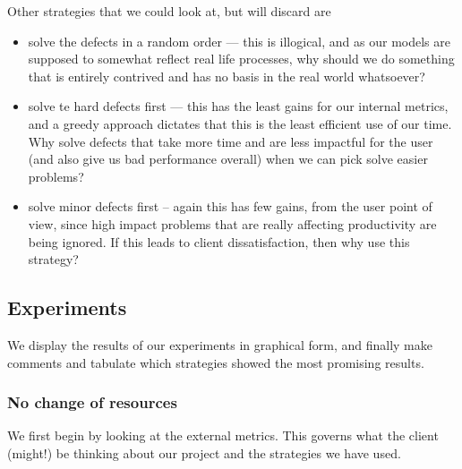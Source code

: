 Other strategies that we could look at, but will discard are
\begin{itemize}
	\item solve the defects in a random order --- this is illogical, and as our models are supposed to
somewhat reflect real life processes, why should we do something that is entirely contrived and has
no basis in the real world whatsoever?
	\item solve te hard defects first --- this has the least gains for our internal metrics, and a greedy approach dictates
that this is the least efficient use of our time.
	Why solve defects that take more time and are less impactful for the user (and also give us bad
performance overall) when we can pick solve easier problems?
	\item solve minor defects first -- again this has few gains, from the user point of view, since
high impact problems that are really affecting productivity are being ignored.
	If this leads to client dissatisfaction, then why use this strategy?
\end{itemize}

\subsection{Experiments}

We display the results of our experiments in graphical form, and finally make comments and tabulate
which strategies showed the most promising results.

\subsubsection{No change of resources}

We first begin by looking at the external metrics.
This governs what the client (might!) be thinking about our project and the strategies we have used.

